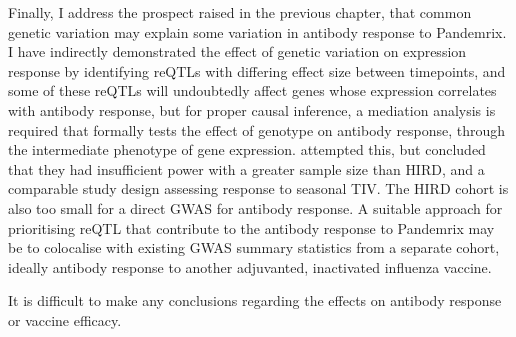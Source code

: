 Finally, I address the prospect raised in the previous chapter, that common genetic variation may explain some variation in antibody response to Pandemrix.
I have indirectly demonstrated the effect of genetic variation on expression response by identifying reQTLs with differing effect size between timepoints,
and some of these reQTLs will undoubtedly affect genes whose expression correlates with antibody response, 
but for proper causal inference, a mediation analysis is required that formally tests the effect of genotype on antibody response, through the intermediate phenotype of gene expression.
\autocite{franco2013IntegrativeGenomicAnalysis} attempted this, but concluded that they had insufficient power with a greater sample size than \gls{HIRD}, and a comparable study design assessing response to seasonal \gls{TIV}.
The \gls{HIRD} cohort is also too small for a direct \gls{GWAS} for antibody response.
A suitable approach for prioritising reQTL that contribute to the antibody response to Pandemrix may be to colocalise with existing GWAS summary statistics from a separate cohort, ideally antibody response to another adjuvanted, inactivated influenza vaccine.


It is difficult to make any conclusions regarding the effects on antibody response or vaccine efficacy.

